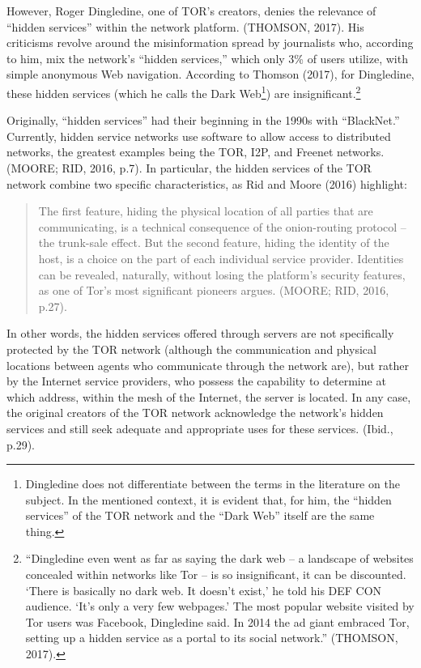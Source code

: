 However, Roger Dingledine, one of TOR's creators, denies the relevance of ``hidden services'' within the network platform. (THOMSON, 2017). His criticisms revolve around the misinformation spread by journalists who, according to him, mix the network's ``hidden services,'' which only 3\% of users utilize, with simple anonymous Web navigation. According to Thomson (2017), for Dingledine, these hidden services (which he calls the Dark Web\footnote{Dingledine does not differentiate between the terms in the literature on the subject. In the mentioned context, it is evident that, for him, the ``hidden services'' of the TOR network and the ``Dark Web'' itself are the same thing.}) are insignificant.\footnote{``Dingledine even went as far as saying the dark web -- a landscape of websites concealed within networks like Tor -- is so insignificant, it can be discounted. `There is basically no dark web. It doesn't exist,' he told his DEF CON audience. `It's only a very few webpages.' The most popular website visited by Tor users was Facebook, Dingledine said. In 2014 the ad giant embraced Tor, setting up a hidden service as a portal to its social network.'' (THOMSON, 2017).}

Originally, ``hidden services'' had their beginning in the 1990s with ``BlackNet.'' Currently, hidden service networks use software to allow access to distributed networks, the greatest examples being the TOR, I2P, and Freenet networks. (MOORE; RID, 2016, p.7). In particular, the hidden services of the TOR network combine two specific characteristics, as Rid and Moore (2016) highlight:

\begin{quote}
The first feature, hiding the physical location of all parties that are communicating, is a technical consequence of the onion-routing protocol -- the trunk-sale effect. But the second feature, hiding the identity of the host, is a choice on the part of each individual service provider. Identities can be revealed, naturally, without losing the platform's security features, as one of Tor's most significant pioneers argues. (MOORE; RID, 2016, p.27).
\end{quote}

In other words, the hidden services offered through servers are not specifically protected by the TOR network (although the communication and physical locations between agents who communicate through the network are), but rather by the Internet service providers, who possess the capability to determine at which address, within the mesh of the Internet, the server is located. In any case, the original creators of the TOR network acknowledge the network's hidden services and still seek adequate and appropriate uses for these services. (Ibid., p.29).

